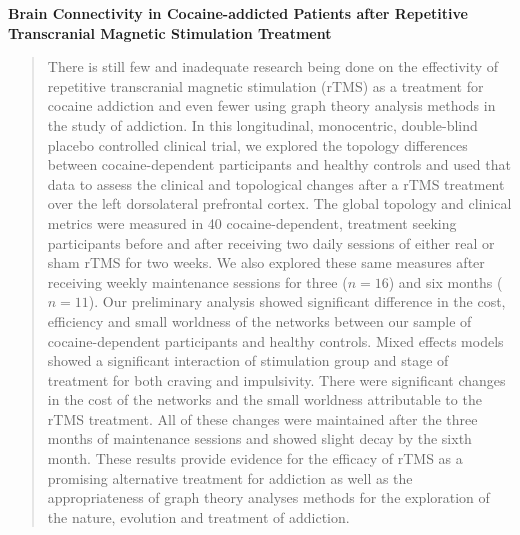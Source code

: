 \begin{center}
    \large\textbf{Brain Connectivity in Cocaine-addicted Patients after Repetitive Transcranial Magnetic Stimulation Treatment}
\end{center}
\begin{quotation}
    \noindent
There is still few and inadequate research being done on the effectivity of repetitive transcranial magnetic stimulation (rTMS) as a treatment for cocaine addiction and even fewer using graph theory analysis methods in the study of addiction. In this longitudinal, monocentric, double-blind placebo controlled clinical trial, we explored the topology differences between cocaine-dependent participants and healthy controls and used that data to assess the clinical and topological changes after a rTMS treatment over the left dorsolateral prefrontal cortex. The global topology and clinical metrics were measured in 40 cocaine-dependent, treatment seeking participants before and after receiving two daily sessions of either real or sham rTMS for two weeks. We also explored these same measures after receiving weekly maintenance sessions for three ($n=16$) and  six months ($n=11$). Our preliminary analysis showed significant difference in the cost, efficiency and small worldness of the networks between our sample of cocaine-dependent participants and healthy controls. Mixed effects models showed a significant interaction of stimulation group and stage of treatment for both craving and impulsivity. There were significant changes in the cost of the networks and the small worldness attributable to the rTMS treatment. All of these changes were maintained after the three months of maintenance sessions and showed slight decay by the sixth month. These results provide evidence for the efficacy of rTMS as a promising alternative treatment for addiction as well as the appropriateness of graph theory analyses methods for the exploration of the nature, evolution and treatment of addiction.
\end{quotation}
\clearpage
{}
